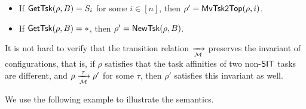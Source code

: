 \noindent {}
\begin{itemize}
	\item If $\mathsf{GetTsk}(\rho, B) = S_i$ for some $i \in [n]$, then $\rho' = \mathsf{MvTsk2Top}(\rho, i)$.
	\item If $\mathsf{GetTsk}(\rho, B) = *$, then $\rho' = \mathsf{NewTsk}(\rho, B)$.
\end{itemize}
It is not hard to verify that the transition relation $\xrightarrow[{\mathcal{M} }]{}$ preserves the invariant of configurations, that is, if $\rho$ satisfies that the task affinities of two non-${\sf SIT}$ tasks are different, and $\rho \xrightarrow[{\mathcal{M} }]{\tau} \rho'$ for some $\tau$, then $\rho'$ satisfies this invariant as well. 


We use the following example to illustrate the semantics.
